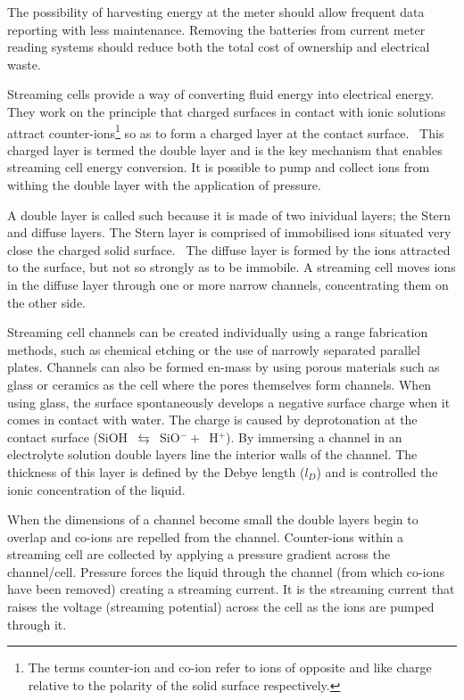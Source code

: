 \documentclass[10pt,final,journal]{IEEEtran}
\begin{document}
    The possibility of harvesting energy at the meter should allow frequent data reporting with less maintenance.
    Removing the batteries from current meter reading systems should reduce both the total cost of ownership and electrical waste.

    Streaming cells provide a way of converting fluid energy into electrical energy.
    They work on the principle that charged surfaces in contact with ionic solutions attract counter-ions\footnote{The terms counter-ion and co-ion refer to ions of opposite and like charge relative to the polarity of the solid surface respectively.} so as to form a charged layer at the contact surface.~\cite{Stein2004}
    This charged layer is termed the double layer and is the key mechanism that enables streaming cell energy conversion.
    It is possible to pump and collect ions from withing the double layer with the application of pressure.

    A double layer is called such because it is made of two inividual layers; the Stern and diffuse layers.
    The Stern layer is comprised of immobilised ions situated very close the charged solid surface.~\cite{Salieb-Beugelaar2009}
    The diffuse layer is formed by the ions attracted to the surface, but not so strongly as to be immobile.
    A streaming cell moves ions in the diffuse layer through one or more narrow channels, concentrating them on the other side.

    Streaming cell channels can be created individually using a range fabrication methods, such as chemical etching or the use of narrowly separated parallel plates.
    Channels can also be formed en-mass by using porous materials such as glass or ceramics as the cell where the pores themselves form channels.
    When using glass, the surface spontaneously develops a negative surface charge when it comes in contact with water.
    The charge is caused by deprotonation at the contact surface (SiOH~$\leftrightarrows$~SiO$^{-}+$~H$^{+}$).
    By immersing a channel in an electrolyte solution double layers line the interior walls of the channel.
    The thickness of this layer is defined by the Debye length ($l_{D}$) and is controlled the ionic concentration of the liquid.~\cite{Israelachvili2011}

    When the dimensions of a channel become small the double layers begin to overlap and co-ions are repelled from the channel.
    Counter-ions within a streaming cell are collected by applying a pressure gradient across the channel/cell.
    Pressure forces the liquid through the channel (from which co-ions have been removed) creating a streaming current.
    It is the streaming current that raises the voltage (streaming potential) across the cell as the ions are pumped through it.
\end{document}
